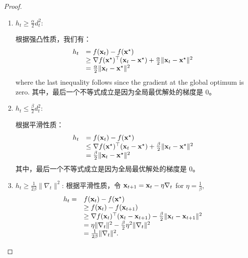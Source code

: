 \begin{proof}

\begin{enumerate}
\item  $h_t \geq \frac{\alpha}{2} d_t^2 $: %

根据强凸性质，我们有：
\begin{equation*}
\begin{array}{cl}
h_t & =  f(\mathbf x_t) - f(\mathbf x^{\star}) \\
& \geq  \nabla f(\mathbf x^{\star})^\top (\mathbf x_t - \mathbf x^{\star}) + \frac{\alpha}{2} \|\mathbf x_t - \mathbf x^{\star}\|^2  \\
 & = \frac{\alpha}{2} \|\mathbf x_t - \mathbf x^{\star}\|^2 
\end{array}
\end{equation*}
where the last inequality follows since the gradient at the global optimum is zero. 
其中，最后一个不等式成立是因为全局最优解处的梯度是 0。
    
    \item  $h_t \leq \frac{\beta}{2} d_t^2 $:  %
    
根据平滑性质：
\begin{equation*}
\begin{array}{cl}
h_t & =  f(\mathbf x_t) - f(\mathbf x^{\star}) \\
& \leq  \nabla f(\mathbf x^{\star})^\top (\mathbf x_t - \mathbf x^{\star}) + \frac{\beta}{2} \|\mathbf x_t - \mathbf x^{\star}\|^2  \\
 & = \frac{\beta}{2} \|\mathbf x_t - \mathbf x^{\star}\|^2 
\end{array}
\end{equation*}
其中，最后一个不等式成立是因为全局最优解处的梯度是 0。



\item  $h_t \geq \frac{1}{2\beta} \|\nabla_t\|^2 $: %
根据平滑性质，令
$\mathbf x_{t+1} = \mathbf x_t - \eta \nabla_t$ for $\eta = \frac{1}{\beta}$, 
\begin{equation*}
\begin{array}{cl}
h_t =  & f(\mathbf x_t) - f(\mathbf x^{\star}) \\
& \geq  f(\mathbf x_t) - f(\mathbf x_{t+1})   \\
 & \geq   \nabla f(\mathbf x_t)^\top (\mathbf x_{t} - \mathbf x_{t+1}) - \frac{\beta}{2} \|\mathbf x_t - \mathbf x_{t+1} \|^2   \\
 & = \eta \|\nabla_t\|^2  - \frac{\beta}{2} \eta^2 \|\nabla_t\|^2 \\
 & = \frac{1}{2\beta} \|\nabla_t\|^2  .
\end{array}
\end{equation*}




\end{enumerate}
\end{proof}
